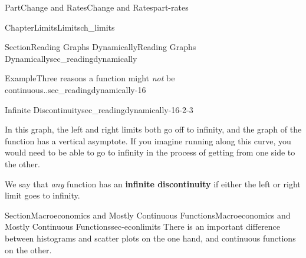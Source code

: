 \documentclass{tufte-book}
\newcommand{\terminology}[1]{\textbf{#1}}
\numberwithin{equation}{chapter}
\begin{document}
\begin{partptx}{Part}{Change and Rates}{}{Change and Rates}{}{}{part-rates}
\begin{chapterptx}{Chapter}{Limits}{}{Limits}{}{}{ch_limits}
\begin{sectionptx}{Section}{Reading Graphs Dynamically}{}{Reading Graphs Dynamically}{}{}{sec_readingdynamically}
\begin{example}{Example}{Three reasons  a function might \emph{not} be continuous..}{sec_readingdynamically-16}
\begin{descriptionlist}
\begin{dlimedium}{Infinite Discontinuity}{sec_readingdynamically-16-2-3}
\begin{image}{0.25}{0.5}{0.25}{}%
%
\end{image}%
 In this graph, the left and right limits both go off to infinity, and the graph of the function has a vertical asymptote. If you imagine running along this curve, you would need to be able to go to infinity in the process of getting from one side to the other.%
\par
We say that \emph{any} function has an \terminology{infinite discontinuity} if either the left or right limit goes to infinity.%
\end{dlimedium}%
\end{descriptionlist}
\end{example}
\end{sectionptx}
%
%
\typeout{************************************************}
\typeout{************************************************}
%
\begin{sectionptx}{Section}{Macroeconomics and Mostly Continuous Functions}{}{Macroeconomics and Mostly Continuous Functions}{}{}{sec-econlimits}
There is an important difference between histograms and scatter plots on the one hand, and continuous functions on the other. \begin{image}{0}{1}{0}{}%
\end{image}
\end{sectionptx}
\end{chapterptx}
\end{partptx}
\end{document}
